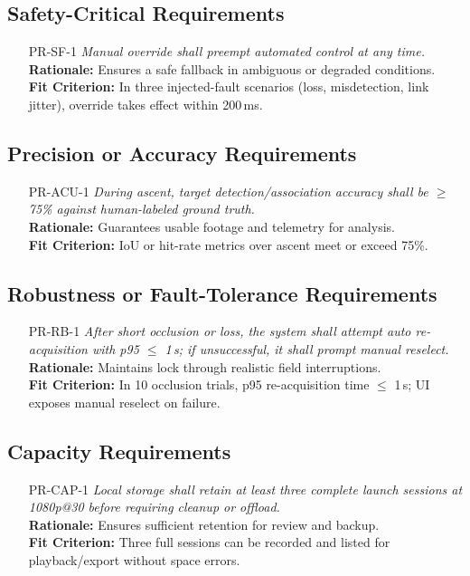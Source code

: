 \documentclass[12pt]{article}
\begin{document}
\subsection{Safety-Critical Requirements}
\begin{itemize}[leftmargin=*]
  \item[PR-SF-1] \emph{Manual override shall preempt automated control at any time.}\\
  \textbf{Rationale:} Ensures a safe fallback in ambiguous or degraded conditions.\\
  \textbf{Fit Criterion:} In three injected-fault scenarios (loss, misdetection, link jitter), override takes effect within 200\,ms.
\end{itemize}
\subsection{Precision or Accuracy Requirements}
\begin{itemize}[leftmargin=*]
  \item[PR-ACU-1] \emph{During ascent, target detection/association accuracy shall be $\geq$ 75\% against human-labeled ground truth.}\\
  \textbf{Rationale:} Guarantees usable footage and telemetry for analysis.\\
  \textbf{Fit Criterion:} IoU or hit-rate metrics over ascent meet or exceed 75\%.
\end{itemize}
\subsection{Robustness or Fault-Tolerance Requirements}
\begin{itemize}[leftmargin=*]
  \item[PR-RB-1] \emph{After short occlusion or loss, the system shall attempt auto re-acquisition with p95 $\leq$ 1\,s; if unsuccessful, it shall prompt manual reselect.}\\
  \textbf{Rationale:} Maintains lock through realistic field interruptions.\\
  \textbf{Fit Criterion:} In 10 occlusion trials, p95 re-acquisition time $\leq$ 1\,s; UI exposes manual reselect on failure.
\end{itemize}

\subsection{Capacity Requirements}
\begin{itemize}[leftmargin=*]
  \item[PR-CAP-1] \emph{Local storage shall retain at least three complete launch sessions at 1080p@30 before requiring cleanup or offload.}\\
  \textbf{Rationale:} Ensures sufficient retention for review and backup.\\
  \textbf{Fit Criterion:} Three full sessions can be recorded and listed for playback/export without space errors.
\end{itemize}
\end{document}
